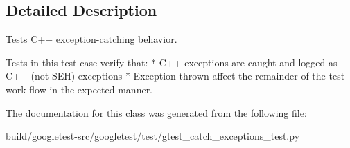 \subsection{Detailed Description}
\begin{DoxyVerb}Tests C++ exception-catching behavior.

   Tests in this test case verify that:
   * C++ exceptions are caught and logged as C++ (not SEH) exceptions
   * Exception thrown affect the remainder of the test work flow in the
     expected manner.
\end{DoxyVerb}
 

The documentation for this class was generated from the following file\+:\begin{DoxyCompactItemize}
\item 
build/googletest-\/src/googletest/test/gtest\+\_\+catch\+\_\+exceptions\+\_\+test.\+py\end{DoxyCompactItemize}
